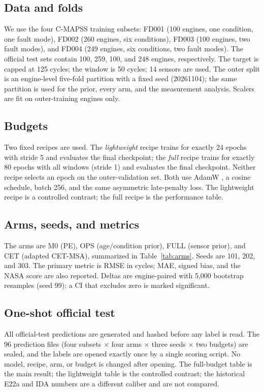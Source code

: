 \documentclass[journal]{IEEEtran}
\begin{document}
\subsection{Data and folds}
We use the four C-MAPSS training subsets: FD001 (100 engines, one condition, one fault mode), FD002 (260 engines, six conditions), FD003 (100 engines, two fault modes), and FD004 (249 engines, six conditions, two fault modes). The official test sets contain 100, 259, 100, and 248 engines, respectively. The target is capped at 125 cycles; the window is 50 cycles; 14 sensors are used. The outer split is an engine-level five-fold partition with a fixed seed (20261104); the same partition is used for the prior, every arm, and the measurement analysis. Scalers are fit on outer-training engines only.

\subsection{Budgets}
Two fixed recipes are used. The \emph{lightweight} recipe trains for exactly 24 epochs with stride 5 and evaluates the final checkpoint; the \emph{full} recipe trains for exactly 80 epochs with all windows (stride 1) and evaluates the final checkpoint. Neither recipe selects an epoch on the outer-validation set. Both use AdamW \cite{ref13}, a cosine schedule, batch 256, and the same asymmetric late-penalty loss. The lightweight recipe is a controlled contrast; the full recipe is the performance table.

\subsection{Arms, seeds, and metrics}
The arms are M0 (PE), OPS (age/condition prior), FULL (sensor prior), and CET (adapted CET-MSA), summarized in Table~\ref{tab:arms}. Seeds are 101, 202, and 303. The primary metric is RMSE in cycles; MAE, signed bias, and the NASA score are also reported. Deltas are engine-paired with 5,000 bootstrap resamples (seed 99); a CI that excludes zero is marked significant.

\subsection{One-shot official test}
All official-test predictions are generated and hashed before any label is read. The 96 prediction files (four subsets $\times$ four arms $\times$ three seeds $\times$ two budgets) are sealed, and the labels are opened exactly once by a single scoring script. No model, recipe, arm, or budget is changed after opening. The full-budget table is the main result; the lightweight table is the controlled contrast; the historical E22a and IDA numbers are a different caliber and are not compared.
\end{document}
